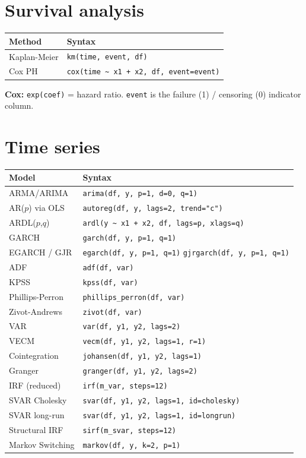 \section{Survival analysis}

\begin{center}
\begin{tabular}{ll}
\toprule
\textbf{Method} & \textbf{Syntax} \\
\midrule
Kaplan-Meier & \texttt{km(time, event, df)} \\
Cox PH       & \texttt{cox(time \textasciitilde{} x1 + x2, df, event=event)} \\
\bottomrule
\end{tabular}
\end{center}

{\footnotesize \textbf{Cox:} \texttt{exp(coef)} = hazard ratio.
\texttt{event} is the failure (1) / censoring (0) indicator column.}

\section{Time series}

\begin{center}
\begin{tabular}{ll}
\toprule
\textbf{Model} & \textbf{Syntax} \\
\midrule
ARMA/ARIMA       & \texttt{arima(df, y, p=1, d=0, q=1)} \\
AR($p$) via OLS  & \texttt{autoreg(df, y, lags=2, trend="c")} \\
ARDL($p$,$q$)    & \texttt{ardl(y \textasciitilde{} x1 + x2, df, lags=p, xlags=q)} \\
GARCH            & \texttt{garch(df, y, p=1, q=1)} \\
EGARCH / GJR     & \texttt{egarch(df, y, p=1, q=1)} \quad \texttt{gjrgarch(df, y, p=1, q=1)} \\
\midrule
ADF              & \texttt{adf(df, var)} \\
KPSS             & \texttt{kpss(df, var)} \\
Phillips-Perron  & \texttt{phillips\_perron(df, var)} \\
Zivot-Andrews    & \texttt{zivot(df, var)} \\
\midrule
VAR              & \texttt{var(df, y1, y2, lags=2)} \\
VECM             & \texttt{vecm(df, y1, y2, lags=1, r=1)} \\
Cointegration    & \texttt{johansen(df, y1, y2, lags=1)} \\
Granger          & \texttt{granger(df, y1, y2, lags=2)} \\
IRF (reduced)    & \texttt{irf(m\_var, steps=12)} \\
SVAR Cholesky    & \texttt{svar(df, y1, y2, lags=1, id=cholesky)} \\
SVAR long-run    & \texttt{svar(df, y1, y2, lags=1, id=longrun)} \\
Structural IRF   & \texttt{sirf(m\_svar, steps=12)} \\
Markov Switching & \texttt{markov(df, y, k=2, p=1)} \\
\bottomrule
\end{tabular}
\end{center}

